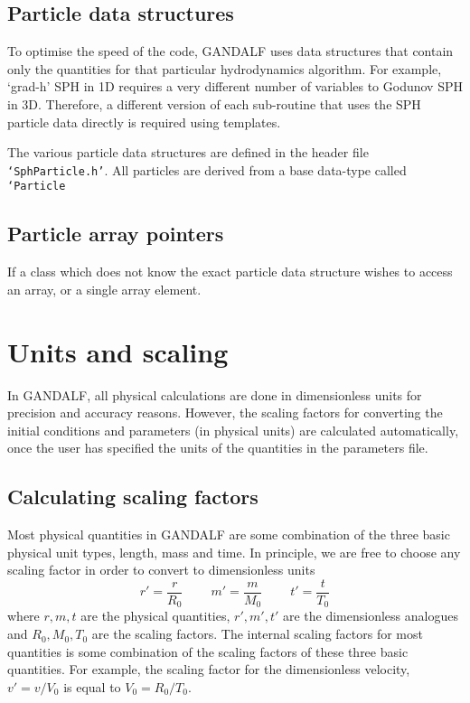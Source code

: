 \documentclass[a4paper]{article}
\newcommand{\var}[1]{\texttt{#1}}
\begin{document}
\subsection{Particle data structures}

To optimise the speed of the code, GANDALF uses data structures that contain only the quantities for that particular hydrodynamics algorithm.  For example, `grad-h' SPH in 1D requires a very different number of variables to Godunov SPH in 3D.  Therefore, a different version of each sub-routine that uses the SPH particle data directly is required using templates.

The various particle data structures are defined in the header file \var{`SphParticle.h'}.  All particles are derived from a base data-type called \var{`Particle}




\subsection{Particle array pointers}

If a class which does not know the exact particle data structure wishes to access an array, or a single array element.


\newpage


\section{Units and scaling} \label{S:UNITS}
In GANDALF, all physical calculations are done in dimensionless units for precision and accuracy reasons.  However, the scaling factors for converting the initial conditions and parameters (in physical units) are calculated automatically, once the user has specified the units of the quantities in the parameters file.


\subsection{Calculating scaling factors}
Most physical quantities in GANDALF are some combination of the three basic physical unit types, length, mass and time.  In principle, we are free to choose any scaling factor in order to convert to dimensionless units
\begin{equation}
r' = \frac{r}{R_0} \;\;\;\;\;\;\;\;
m' = \frac{m}{M_0} \;\;\;\;\;\;\;\;
t' = \frac{t}{T_0}
\end{equation}
where $r, m, t$ are the physical quantities, $r', m', t'$ are the dimensionless analogues and $R_0, M_0, T_0$ are the scaling factors.  The internal scaling factors for most quantities is some combination of the scaling factors of these three basic quantities.  For example, the scaling factor for the dimensionless velocity, $v' = v/V_0$ is equal to $V_0 = R_0/T_0$.
\end{document}
